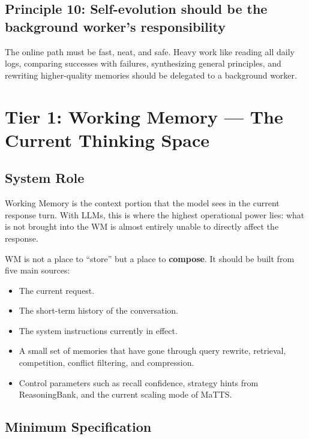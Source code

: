 \documentclass[a4paper,12pt]{article}
\begin{document}
\subsection*{Principle 10: Self-evolution should be the background worker's responsibility}

The online path must be fast, neat, and safe. Heavy work like reading all daily logs, comparing successes with failures, synthesizing general principles, and rewriting higher-quality memories should be delegated to a background worker.

\section{Tier 1: Working Memory --- The Current Thinking Space}

\subsection*{System Role}

Working Memory is the context portion that the model sees in the current response turn. With LLMs, this is where the highest operational power lies: what is not brought into the WM is almost entirely unable to directly affect the response.

WM is not a place to ``store'' but a place to \textbf{compose}. It should be built from five main sources:
\begin{itemize}
    \item The current request.
    \item The short-term history of the conversation.
    \item The system instructions currently in effect.
    \item A small set of memories that have gone through query rewrite, retrieval, competition, conflict filtering, and compression.
    \item Control parameters such as recall confidence, strategy hints from ReasoningBank, and the current scaling mode of MaTTS.
\end{itemize}

\subsection*{Minimum Specification}
\end{document}
